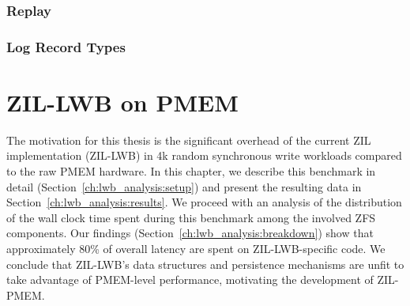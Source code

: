 \documentclass[12pt,a4paper,twoside]{book}
\begin{document}
\subsection{Replay}


\subsection{Log Record Types}

\chapter{ZIL-LWB on PMEM}\label{ch:lwb_analysis}
The motivation for this thesis is the significant overhead of the current ZIL implementation (ZIL-LWB) in 4k random synchronous write workloads compared to the raw PMEM hardware.
In this chapter, we describe this benchmark in detail (Section~\ref{ch:lwb_analysis:setup}) and present the resulting data in Section~\ref{ch:lwb_analysis:results}.
We proceed with an analysis of the distribution of the wall clock time spent during this benchmark among the involved ZFS components.
Our findings (Section~\ref{ch:lwb_analysis:breakdown}) show that approximately 80\% of overall latency are spent on ZIL-LWB-specific code.
We conclude that ZIL-LWB's data structures and persistence mechanisms are unfit to take advantage of PMEM-level performance, motivating the development of ZIL-PMEM.
\end{document}
